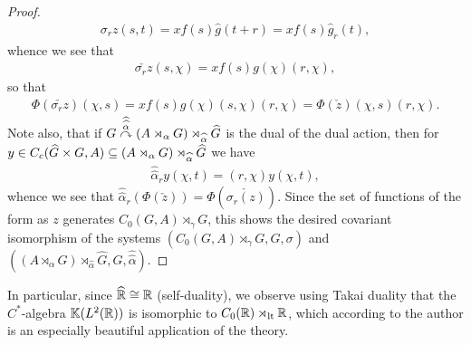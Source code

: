 \begin{proof}
\begin{align*}
	\sigma_r z(s,t) = x f(s)  \hat g(t+r) = x f(s) \hat g_r(t),
\end{align*}
whence we see that
\begin{align*}
	\check{ \sigma_r z}(s,\chi) = x f(s) g(\chi) (r,\chi),
\end{align*}
so that
\begin{align*}
\Phi(\check{ \sigma_r z})(\chi,s) = x f(s) g(\chi)(s,\chi)(r,\chi) = \Phi(\check z)(\chi,s) (r,\chi).
\end{align*}
Note also, that if $G \stackrel{\widehat{\widehat{\alpha}}}{\curvearrowright} (A \rtimes_\alpha G) \rtimes_{\widehat{\alpha}} \widehat{G}$ is the dual of the dual action, then for $y \in C_c(\widehat{G} \times G, A) \subseteq (A \rtimes_\alpha G) \rtimes_{\widehat{\alpha}} \widehat{G}$ we have
\begin{align*}
	\hat{\hat{\alpha}}_r y(\chi,t) = (r,\chi) y(\chi,t),
\end{align*}
whence we see that $\hat{\hat{\alpha}}_r(\Phi(\check z))= \Phi(\check{\sigma_r (z)})$. Since the set of functions of the form as $z$ generates $C_0(G,A) \rtimes_\gamma G$, this shows the desired covariant isomorphism of the systems $(C_0(G,A) \rtimes_\gamma G, G, \sigma)$ and $( (A \rtimes_\alpha G)\rtimes_{\hat{\alpha}} \hat G, G, \hat{\hat{\alpha}})$.
\end{proof}
In particular, since $\widehat{\mathbb{R}} \cong \mathbb{R}$ (self-duality), we observe using Takai duality that the $C^*$-algebra $\mathbb{K}(L^2(\mathbb{R}))$ is isomorphic to $C_0(\mathbb{R}) \rtimes_\mathrm{lt} \mathbb{R} $, which according to the author is an especially beautiful application of the theory.

